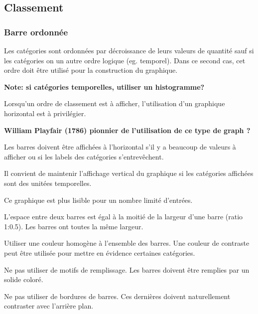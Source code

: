 \documentclass[a4paper,12pt]{article}
\begin{document}
\begin{multicols}{2}
\subsection{Classement}
\label{sec:orgbe985b7}
\subsubsection{Barre ordonnée}
\label{sec:orgf436168}
Les catégories sont ordonnées par décroissance de leurs valeurs de quantité\autocite{jonathanschwabishComparingCategories2021} sauf si les catégories on un autre ordre logique (eg. temporel). Dans ce second cas, cet ordre doit être utilisé pour la construction du graphique. \autocite{wilkeVisualizingAmounts2019}

\textbf{Note: si catégories temporelles, utiliser un histogramme?}

Lorsqu'un ordre de classement est à afficher, l'utilisation d'un graphique horizontal est à privilégier. \autocite{andreaskrauseBestPracticesData2024}

\textbf{William Playfair (1786) pionnier de l'utilisation de ce type de graph ?}

Les barres doivent être affichées à l'horizontal s'il y a beaucoup de valeurs à afficher ou si les labels des catégories s'entrevêchent. \autocite{alansmithLexiqueVisuel,sosulskiGraphics2019,wilkeVisualizingAmounts2019,stephenfewComponentlevelGraphDesign2012,jonathanschwabishComparingCategories2021}

Il convient de maintenir l'affichage vertical du graphique si les catégories affichées sont des unitées temporelles. \autocite{stephenfewComponentlevelGraphDesign2012}

Ce graphique est plus lisible pour un nombre limité d'entrées. \autocite{mikeyiHowChooseRight2020}

L'espace entre deux barres est égal à la moitié de la largeur d'une barre (ratio 1:0.5). Les barres ont toutes la même largeur. \autocite{stephenfewComponentlevelGraphDesign2012}

Utiliser une couleur homogène à l'ensemble des barres. Une couleur de contraste peut être utilisée pour mettre en évidence certaines catégories.

Ne pas utiliser de motifs de remplissage. Les barres doivent être remplies par un solide coloré. \autocite{stephenfewComponentlevelGraphDesign2012}

Ne pas utiliser de bordures de barres. Ces dernières doivent naturellement contraster avec l'arrière plan.


\end{multicols}
\end{document}
